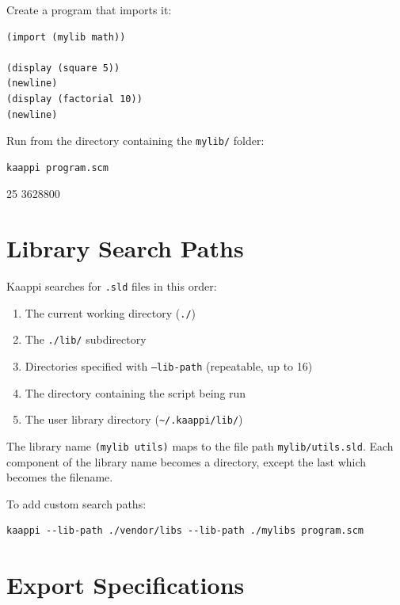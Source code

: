 Create a program that imports it:

\begin{lstlisting}
(import (mylib math))

(display (square 5))
(newline)
(display (factorial 10))
(newline)
\end{lstlisting}

Run from the directory containing the \texttt{mylib/} folder:

\begin{Verbatim}[fontsize=\small]
kaappi program.scm
\end{Verbatim}

\begin{codeoutput}
25
3628800
\end{codeoutput}

\section{Library Search Paths}

Kaappi searches for \texttt{.sld} files in this order:

\begin{enumerate}
    \item The current working directory (\texttt{./})
    \item The \texttt{./lib/} subdirectory
    \item Directories specified with \texttt{--lib-path} (repeatable, up to 16)
    \item The directory containing the script being run
    \item The user library directory (\texttt{\textasciitilde/.kaappi/lib/})
\end{enumerate}

The library name \texttt{(mylib utils)} maps to the file path \texttt{mylib/utils.sld}. Each component of the library name becomes a directory, except the last which becomes the filename.

To add custom search paths:

\begin{Verbatim}[fontsize=\small]
kaappi --lib-path ./vendor/libs --lib-path ./mylibs program.scm
\end{Verbatim}

\section{Export Specifications}

